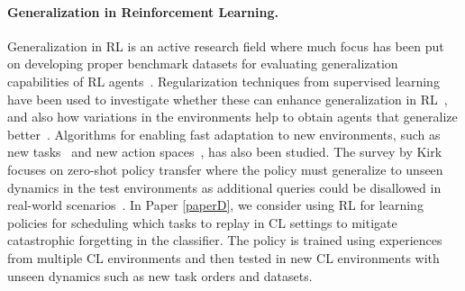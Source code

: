 \paragraph{Generalization in Reinforcement Learning.} Generalization in RL is an active research field where much focus has been put on developing proper benchmark datasets for evaluating generalization capabilities of RL agents~\cite{cobbe2019quantifying, cobbe2020leveraging, nichol2018gotta, yu2020meta}. 
Regularization techniques from supervised learning have been used to investigate whether these can enhance generalization in RL~\cite{cobbe2019quantifying, farebrother2018generalization, igl2019generalization}, and also how variations in the environments help to obtain agents that generalize better~\cite{packer2018assessing, zhang2018dissection}. Algorithms for enabling fast adaptation to new environments, such as new tasks~\cite{finn2017model, kessler2021same} and new action spaces~\cite{chandak2019learning, jain2020generalization}, has also been studied. The survey by Kirk \etal~\cite{kirk2021survey} focuses on zero-shot policy transfer where the policy must generalize to unseen dynamics in the test environments as additional queries could be disallowed in real-world scenarios~\cite{yang2019single, ball2021augmented}. 
In Paper \ref{paperD}, we consider using RL for learning policies for scheduling which tasks to replay in CL settings to mitigate catastrophic forgetting in the classifier. The policy is trained using experiences from multiple CL environments and then tested in new CL environments with unseen dynamics such as new task orders and datasets. 




